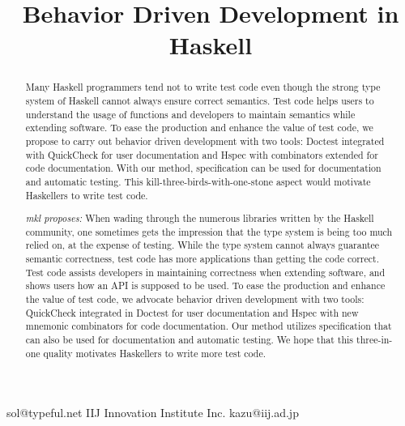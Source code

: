 \documentclass[preprint]{sigplanconf}
\begin{document}
\copyrightdata{[to be supplied]}


\title{Behavior Driven Development in Haskell}

           {}
           {sol@typeful.net}
           {IIJ Innovation Institute Inc.}
           {kazu@iij.ad.jp}

\maketitle

\begin{abstract}

Many Haskell programmers tend not to write test code even though the
strong type system of Haskell cannot always ensure correct semantics.
Test code helps users to understand the usage of
functions and developers to maintain semantics
while extending software. To ease the production and enhance the value of test code, we
propose to carry out behavior driven development with two tools:
Doctest integrated with QuickCheck for user documentation and Hspec
with combinators extended for code documentation. With our
method, specification can be used for documentation and automatic
testing. This kill-three-birds-with-one-stone aspect would motivate
Haskellers to write test code.

\emph{mkl proposes:}
When wading through the numerous libraries written by
the Haskell community, one sometimes gets the impression that the type
system is being too much relied on, at the expense of testing.
While the type system cannot always guarantee semantic correctness,
test code has more applications than getting the code correct.
Test code assists developers in maintaining correctness when extending
software, and shows users how an API is supposed to be used.
To ease the production and enhance the value of test code, we advocate
behavior driven development with two tools:
QuickCheck integrated in Doctest for user documentation and Hspec
with new mnemonic combinators for code documentation.
Our method utilizes specification that can also be used for
documentation and automatic testing. We hope that this three-in-one
quality motivates Haskellers to write more test code.


\end{abstract}
\end{document}
